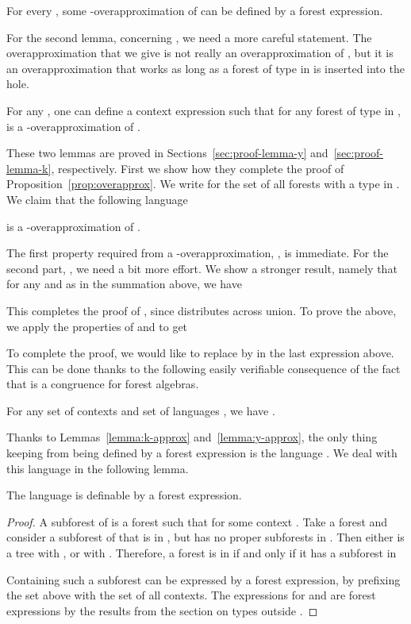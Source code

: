\documentclass{LMCS}
\begin{document}
\begin{lem}\label{lemma:y-approx}
  For every , some -overapproximation  of  can be
  defined by a  forest expression.
\end{lem}

For the second lemma, concerning , we need a more careful
statement. The overapproximation that we give is not really an
overapproximation of , but it is an overapproximation that works
as long as a forest of type in  is inserted into the hole.
\begin{lem}\label{lemma:k-approx}
  For any , one can define a  context
  expression  such that for any forest  of type in
  ,  is a -overapproximation of .
\end{lem}


These two lemmas are proved in Sections~\ref{sec:proof-lemma-y}
and~\ref{sec:proof-lemma-k}, respectively. First we show how they
complete the proof of Proposition~\ref{prop:overapprox}. We write  for the
set of all forests with a type in . We claim that the  following
language

is a -overapproximation of . 

The first property required from a -overapproximation, , is immediate. For the second part, , we need a bit more effort. We show a stronger result, namely that for
any  and  as in the summation above, we have

This completes the proof of , since
 distributes across union.  To prove the above, we apply the
properties of   and  to get

To complete the proof, we would like to replace  by  in
the last expression above. This can be done thanks to the following
easily verifiable consequence of the fact that  is a congruence for
forest algebras.
\begin{fact}
 For any set of contexts  and set of languages , we have
 .
\end{fact}

Thanks to Lemmas~\ref{lemma:k-approx} and~\ref{lemma:y-approx}, the
only thing keeping  from being defined by a 
forest expression is  the language . We deal with this
language in the following lemma.

\begin{lem}
 The language     is definable by a
  forest expression.
\end{lem}
\begin{proof}
  A subforest of  is a forest  such that  for some context
  .  Take a forest  and consider a subforest
   of  that is in , but has no proper subforests in
  .  Then either  is a tree  with , or  with . Therefore, a
  forest is in   if and only if it has a subforest in
  
  Containing such a subforest can be expressed by a  forest
  expression, by prefixing the set above with the set of all contexts.
  The expressions for  and  are 
  forest expressions by the results from the section on types outside .
\end{proof}
\end{document}
